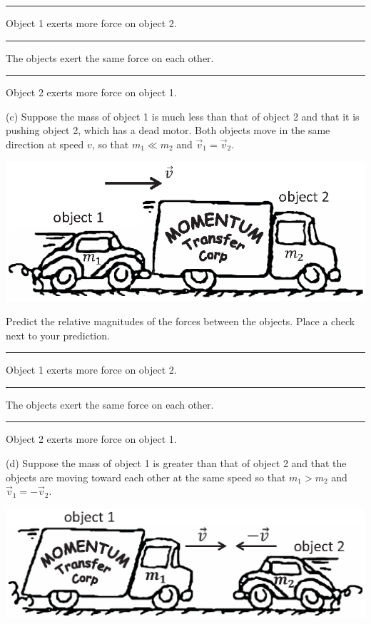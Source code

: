 \rule{0.5in}{0.1pt} Object 1 exerts more force on object 2. 

\rule{0.5in}{0.1pt} The objects exert the same force on each other.

\rule{0.5in}{0.1pt} Object 2 exerts more force on object 1.

\leftskip=0cm

\bigskip
(c) Suppose the mass of object 1 is much less than that of object 2 and that
it is pushing object 2, which has a dead motor.  Both objects move in the
same direction at speed $v$, so that
$m_{1}\ll m_{2}$ and
${\vec  v}_1={\vec  v}_2$.


{\par\centering \includegraphics{newtons_laws/newtons_laws_fig3_new.eps} \par}

\leftskip=1cm

Predict the relative magnitudes of the forces between the objects.
Place a check next to your prediction. 

\rule{0.5in}{0.1pt} Object 1 exerts more force on object 2. 

\rule{0.5in}{0.1pt} The objects exert the same force on each other. 

\rule{0.5in}{0.1pt} Object 2 exerts more force on object 1.

\leftskip=0cm

\bigskip
(d) Suppose the mass of object 1 is greater than that of object 2 and that the
objects are moving toward each other at the same speed so that
$m_{1}>m_{2}$ and
${\vec  v}_{1}=-{{\vec  v}_{2}}$.

{\par\centering \includegraphics{newtons_laws/newtons_laws_fig4_new.eps} \par}

